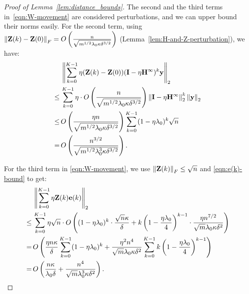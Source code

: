 \begin{proof}[Proof of Lemma~\ref{lem:distance_bounds}]
	The second and the third terms in~\eqref{eqn:W-movement} are considered perturbations, and we can upper bound their norms easily.
	For the second term, using $\left\|\mathbf{Z}(k) - \mathbf{Z}(0)\right\|_F = O\left( \frac{n}{\sqrt{m^{1/2} \lambda_0 \kappa \delta^{3/2}}} \right)$ (Lemma~\ref{lem:H-and-Z-perturbation}), we have:
	\begin{equation} \label{eqn:W-movement-perturbation-1}
	\begin{aligned}
	& \left\|\sum_{k=0}^{K-1} \eta (\mathbf{Z}(k) - \mathbf{Z}(0)) (\mathbf{I} - \eta \mathbf{H}^\infty)^k \mathbf{y}\right\|_2 \\
	\le\,& \sum_{k=0}^{K-1} \eta \cdot O\left( \frac{n}{\sqrt{m^{1/2} \lambda_0 \kappa \delta^{3/2}}} \right) \left\|\mathbf{I} - \eta \mathbf{H}^\infty\right\|_2^k \left\|\mathbf{y}\right\|_2 \\
	\le\,&  O\left( \frac{\eta n}{\sqrt{m^{1/2} \lambda_0 \kappa \delta^{3/2}}} \right)  \sum_{k=0}^{K-1} (1-\eta\lambda_0)^k \sqrt n \\
	=\,& O\left( \frac{ n^{3/2}}{ \sqrt{m^{1/2} \lambda_0^3 \kappa \delta^{3/2}}} \right) . 
	\end{aligned}
	\end{equation}
	
	For the third term in \eqref{eqn:W-movement}, we use $\left\|\mathbf{Z}(k)\right\|_F \le \sqrt n$ and \eqref{eqn:e(k)-bound} to get:
	\begin{equation} \label{eqn:W-movement-perturbation-2}
	\begin{aligned}
	&\left\|\sum_{k=0}^{K-1} \eta \mathbf{Z}(k)  \mathbf{e}(k)\right\|_2\\
	\le\,& \sum_{k=0}^{K-1} \eta \sqrt n \cdot O\left(  (1-\eta \lambda_0)^k \cdot \frac{\sqrt n \kappa}{ \delta}  + k\left(1-\frac{\eta \lambda_0}{4}\right)^{k-1}\cdot \frac{\eta n^{7/2}}{\sqrt m \lambda_0 \kappa \delta^{2}}  \right) \\
	=\,& O\left( \frac{\eta  n \kappa}{ \delta} \sum_{k=0}^{K-1}     (1-\eta \lambda_0)^k 
		+ \frac{\eta^2  n^4}{\sqrt m \lambda_0 \kappa \delta^{2}} \sum_{k=0}^{K-1} k\left(1-\frac{\eta \lambda_0}{4}\right)^{k-1} \right) \\
	=\,& O\left( \frac{  n \kappa}{\lambda_0 \delta} + \frac{  n^4}{\sqrt m \lambda_0^3 \kappa \delta^{2}}  \right).
	\end{aligned}
	\end{equation}
	

\end{proof}
